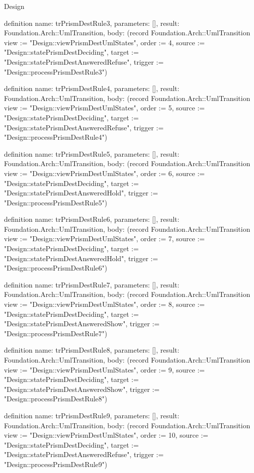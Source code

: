 \begin{lexlean}{Design}
\begin{semanticmodule}
definition{
  name: trPrismDestRule3,
  parameters: [],
  result: Foundation.Arch::UmlTransition,
  body: (record Foundation.Arch::UmlTransition {view := "Design::viewPrismDestUmlStates", order := 4, source := "Design::statePrismDestDeciding", target := "Design::statePrismDestAnsweredRefuse", trigger := "Design::processPrismDestRule3"})
}

definition{
  name: trPrismDestRule4,
  parameters: [],
  result: Foundation.Arch::UmlTransition,
  body: (record Foundation.Arch::UmlTransition {view := "Design::viewPrismDestUmlStates", order := 5, source := "Design::statePrismDestDeciding", target := "Design::statePrismDestAnsweredRefuse", trigger := "Design::processPrismDestRule4"})
}

definition{
  name: trPrismDestRule5,
  parameters: [],
  result: Foundation.Arch::UmlTransition,
  body: (record Foundation.Arch::UmlTransition {view := "Design::viewPrismDestUmlStates", order := 6, source := "Design::statePrismDestDeciding", target := "Design::statePrismDestAnsweredHold", trigger := "Design::processPrismDestRule5"})
}

definition{
  name: trPrismDestRule6,
  parameters: [],
  result: Foundation.Arch::UmlTransition,
  body: (record Foundation.Arch::UmlTransition {view := "Design::viewPrismDestUmlStates", order := 7, source := "Design::statePrismDestDeciding", target := "Design::statePrismDestAnsweredHold", trigger := "Design::processPrismDestRule6"})
}

definition{
  name: trPrismDestRule7,
  parameters: [],
  result: Foundation.Arch::UmlTransition,
  body: (record Foundation.Arch::UmlTransition {view := "Design::viewPrismDestUmlStates", order := 8, source := "Design::statePrismDestDeciding", target := "Design::statePrismDestAnsweredShow", trigger := "Design::processPrismDestRule7"})
}

definition{
  name: trPrismDestRule8,
  parameters: [],
  result: Foundation.Arch::UmlTransition,
  body: (record Foundation.Arch::UmlTransition {view := "Design::viewPrismDestUmlStates", order := 9, source := "Design::statePrismDestDeciding", target := "Design::statePrismDestAnsweredShow", trigger := "Design::processPrismDestRule8"})
}

definition{
  name: trPrismDestRule9,
  parameters: [],
  result: Foundation.Arch::UmlTransition,
  body: (record Foundation.Arch::UmlTransition {view := "Design::viewPrismDestUmlStates", order := 10, source := "Design::statePrismDestDeciding", target := "Design::statePrismDestAnsweredRefuse", trigger := "Design::processPrismDestRule9"})
}


\end{semanticmodule}
\end{lexlean}
